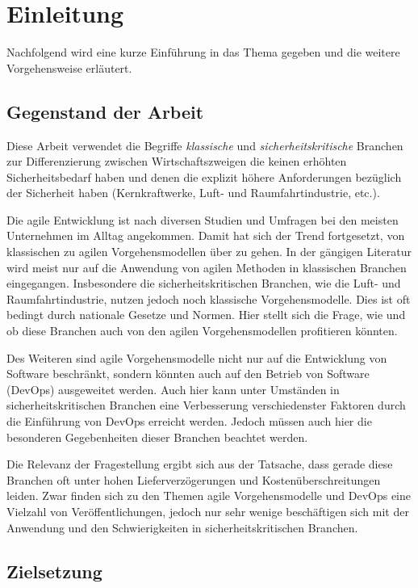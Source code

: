 \chapter{Einleitung} %

Nachfolgend wird eine kurze Einführung in das Thema gegeben und die weitere Vorgehensweise erläutert.

\section{Gegenstand der Arbeit}

Diese Arbeit verwendet die Begriffe \emph{klassische} und \emph{sicherheitskritische} Branchen zur Differenzierung zwischen Wirtschaftszweigen die keinen erhöhten Sicherheitsbedarf haben und denen die explizit höhere Anforderungen bezüglich der Sicherheit haben (Kernkraftwerke, Luft- und Raumfahrtindustrie, etc.).

Die agile Entwicklung ist nach diversen Studien und Umfragen \parencite[vgl.][]{VersionOne:2015aa, HP:2015aa} bei den meisten Unternehmen im Alltag angekommen.
Damit hat sich der Trend fortgesetzt, von klassischen zu agilen Vorgehensmodellen über zu gehen.
In der gängigen Literatur wird meist nur auf die Anwendung von agilen Methoden in klassischen Branchen eingegangen.
Insbesondere die sicherheitskritischen Branchen, wie die Luft- und Raumfahrtindustrie, nutzen jedoch noch klassische Vorgehensmodelle.
Dies ist oft bedingt durch nationale Gesetze und Normen.
Hier stellt sich die Frage, wie und ob diese Branchen auch von den agilen Vorgehensmodellen profitieren könnten.

Des Weiteren sind agile Vorgehensmodelle nicht nur auf die Entwicklung von Software beschränkt, sondern könnten auch auf den Betrieb von Software (DevOps) ausgeweitet werden.
Auch hier kann unter Umständen in sicherheitskritischen Branchen eine Verbesserung verschiedenster Faktoren durch die Einführung von DevOps erreicht werden.
Jedoch müssen auch hier die besonderen Gegebenheiten dieser Branchen beachtet werden.

Die Relevanz der Fragestellung ergibt sich aus der Tatsache, dass gerade diese Branchen oft unter hohen Lieferverzögerungen und Kostenüberschreitungen leiden.
Zwar finden sich zu den Themen agile Vorgehensmodelle und DevOps eine Vielzahl von Veröffentlichungen, jedoch nur sehr wenige beschäftigen sich mit der Anwendung und den Schwierigkeiten in sicherheitskritischen Branchen.

\section{Zielsetzung}

